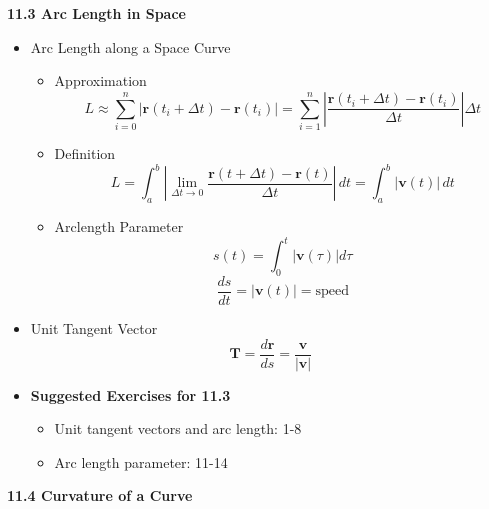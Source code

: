 \documentclass[12pt]{article}
\renewcommand{\vec}[1]{\mathbf{#1}}
\newcommand{\dvar}[1]{\,d{#1}}
\newcommand{\<}{\left<}
\renewcommand{\>}{\right>}
\begin{document}
  \newpage
  
  \centerline{\bf 11.3 Arc Length in Space}
  
    \begin{itemize}
      \item Arc Length along a Space Curve
        \begin{itemize}
          \item Approximation 
            \[L \approx \sum_{i=0}^n |\vec{r}(t_i+\Delta{t})-\vec{r}(t_i)|=\sum_{i=1}^n \left|\frac{\vec{r}(t_i+\Delta{t})-\vec{r}(t_i)}{\Delta{t}}\right|\Delta{t}\]
          \item Definition 
            \[L = \int_a^b \left|\lim_{\Delta{t}\to0}\frac{\vec{r}(t+\Delta{t})-\vec{r}(t)}{\Delta{t}}\right| \dvar{t} = \int_a^b |\vec{v}(t)| \dvar{t}\]
          \item Arclength Parameter 
            \[s(t) = \int_0^t |\vec{v}(\tau)|d\tau\]
            \[\frac{ds}{dt} = |\vec{v}(t)| = \text{speed}\]
        \end{itemize}

      \item Unit Tangent Vector
        \[\vec{T} = \frac{d\vec{r}}{ds} = \frac{\vec{v}}{|\vec{v}|}\]

      \item \textbf{Suggested Exercises for 11.3}
        \begin{itemize}
        \item Unit tangent vectors and arc length: 1-8
        \item Arc length parameter: 11-14
        \end{itemize}
    \end{itemize}
  
  \newpage
  
  \centerline{\bf 11.4 Curvature of a Curve}
  
\end{document}
